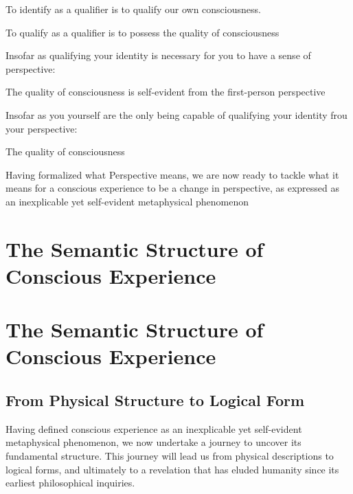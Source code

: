 \documentclass[runningheads]{llncs}
\begin{document}
\setcounter{definition}{1}
\begin{assertion}
	To identify as a qualifier is to qualify our own consciousness. 
\end{assertion}

\setcounter{definition}{1}
\begin{assertion}
	To qualify as a qualifier is to possess the quality of consciousness
\end{assertion}

Insofar as qualifying your identity is necessary for you to have a sense of perspective:

\setcounter{definition}{1}
\begin{assertion}
	The quality of consciousness is self-evident from the first-person perspective
\end{assertion}

Insofar as you yourself are the only being capable of qualifying your identity frou your perspective:

\setcounter{definition}{1}
\begin{assertion}
	The quality of consciousness 
\end{assertion}

Having formalized what Perspective means, we are now ready to tackle what it means for a conscious experience to be a change in perspective, as expressed as an inexplicable yet self-evident metaphysical phenomenon


\section{The Semantic Structure of Conscious Experience}

\section{The Semantic Structure of Conscious Experience}

\subsection{From Physical Structure to Logical Form}

Having defined conscious experience as an inexplicable yet self-evident metaphysical phenomenon, we now undertake a journey to uncover its fundamental structure. This journey will lead us from physical descriptions to logical forms, and ultimately to a revelation that has eluded humanity since its earliest philosophical inquiries.
\end{document}
